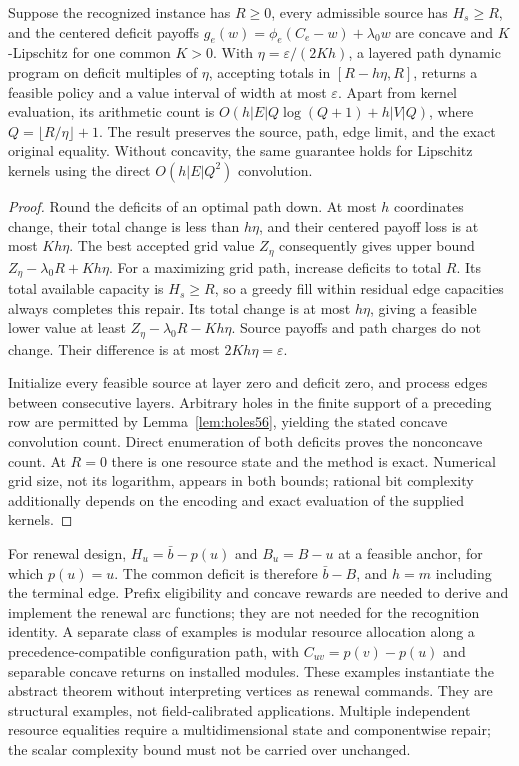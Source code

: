\begin{theorem}\label{thm:abstractapprox59}
Suppose the recognized instance has $R\geq0$, every admissible source has $H_s\geq R$, and the centered deficit payoffs
$g_e(w)=\phi_e(C_e-w)+\lambda_0w$ are concave and $K$-Lipschitz for one common $K>0$. With $\eta=\varepsilon/(2Kh)$, a layered path dynamic program on deficit multiples of $\eta$, accepting totals in $[R-h\eta,R]$, returns a feasible policy and a value interval of width at most $\varepsilon$. Apart from kernel evaluation, its arithmetic count is
$O(h|E|Q\log(Q+1)+h|V|Q)$, where $Q=\lfloor R/\eta\rfloor+1$. The result preserves the source, path, edge limit, and the exact original equality. Without concavity, the same guarantee holds for Lipschitz kernels using the direct $O(h|E|Q^2)$ convolution.
\end{theorem}
\begin{proof}
Round the deficits of an optimal path down. At most $h$ coordinates change, their total change is less than $h\eta$, and their centered payoff loss is at most $Kh\eta$. The best accepted grid value $Z_\eta$ consequently gives upper bound $Z_\eta-\lambda_0R+Kh\eta$. For a maximizing grid path, increase deficits to total $R$. Its total available capacity is $H_s\geq R$, so a greedy fill within residual edge capacities always completes this repair. Its total change is at most $h\eta$, giving a feasible lower value at least $Z_\eta-\lambda_0R-Kh\eta$. Source payoffs and path charges do not change. Their difference is at most $2Kh\eta=\varepsilon$.

Initialize every feasible source at layer zero and deficit zero, and process edges between consecutive layers. Arbitrary holes in the finite support of a preceding row are permitted by Lemma~\ref{lem:holes56}, yielding the stated concave convolution count. Direct enumeration of both deficits proves the nonconcave count. At $R=0$ there is one resource state and the method is exact. Numerical grid size, not its logarithm, appears in both bounds; rational bit complexity additionally depends on the encoding and exact evaluation of the supplied kernels.
\end{proof}

For renewal design, $H_u=\bar b-p(u)$ and $B_u=B-u$ at a feasible anchor, for which $p(u)=u$. The common deficit is therefore $\bar b-B$, and $h=m$ including the terminal edge. Prefix eligibility and concave rewards are needed to derive and implement the renewal arc functions; they are not needed for the recognition identity. A separate class of examples is modular resource allocation along a precedence-compatible configuration path, with $C_{uv}=p(v)-p(u)$ and separable concave returns on installed modules. These examples instantiate the abstract theorem without interpreting vertices as renewal commands. They are structural examples, not field-calibrated applications. Multiple independent resource equalities require a multidimensional state and componentwise repair; the scalar complexity bound must not be carried over unchanged.
